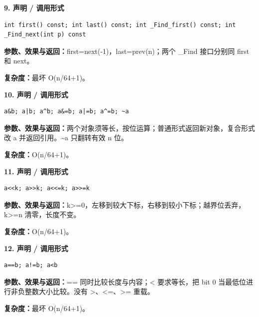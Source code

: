 \documentclass[UTF8,a4paper,10pt]{ctexart}
\begin{document}
\noindent\begin{minipage}{\textwidth}
\textbf{9. 声明 / 调用形式}
\begin{lstlisting}
int first() const; int last() const; int _Find_first() const; int _Find_next(int p) const
\end{lstlisting}
\textbf{参数、效果与返回：}first=next(-1)，last=prev(n)；两个 \_Find 接口分别同 first 和 next。

\textbf{复杂度：}最坏 O(n/64+1)。

\end{minipage}\par\vspace{0.4em}
\noindent\begin{minipage}{\textwidth}
\textbf{10. 声明 / 调用形式}
\begin{lstlisting}
a&b; a|b; a^b; a&=b; a|=b; a^=b; ~a
\end{lstlisting}
\textbf{参数、效果与返回：}两个对象须等长，按位运算；普通形式返回新对象，复合形式改 a 并返回引用。\textasciitilde{}a 只翻转有效 n 位。

\textbf{复杂度：}O(n/64+1)。

\end{minipage}\par\vspace{0.4em}
\noindent\begin{minipage}{\textwidth}
\textbf{11. 声明 / 调用形式}
\begin{lstlisting}
a<<k; a>>k; a<<=k; a>>=k
\end{lstlisting}
\textbf{参数、效果与返回：}k>=0，左移到较大下标，右移到较小下标；越界位丢弃，k>=n 清零，长度不变。

\textbf{复杂度：}O(n/64+1)。

\end{minipage}\par\vspace{0.4em}
\noindent\begin{minipage}{\textwidth}
\textbf{12. 声明 / 调用形式}
\begin{lstlisting}
a==b; a!=b; a<b
\end{lstlisting}
\textbf{参数、效果与返回：}== 同时比较长度与内容；< 要求等长，把 bit 0 当最低位进行非负整数大小比较。没有 >、<=、>= 重载。

\textbf{复杂度：}最坏 O(n/64+1)。

\end{minipage}\par\vspace{0.4em}
\end{document}
